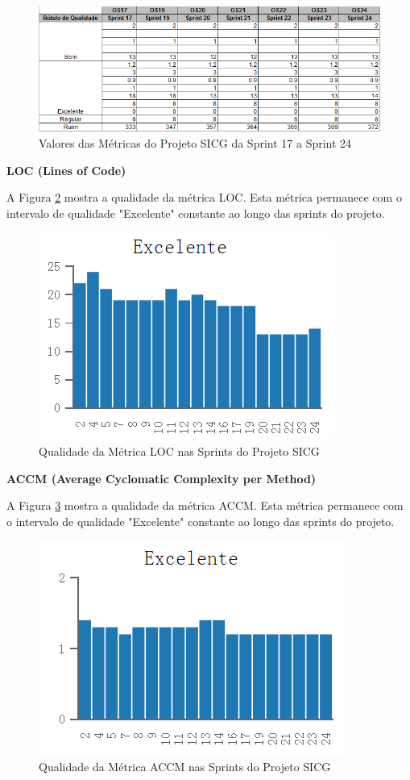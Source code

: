 \begin{figure}[H]
		\centering
			\includegraphics[scale=0.9]{figuras/metricas1724.png}
		\caption{Valores das Métricas do Projeto SICG da Sprint 17 a Sprint 24}
		\label{metricasprint3}
\end{figure}


\textbf{LOC (Lines of Code)}

A Figura \ref{loc} mostra a qualidade da métrica LOC. Esta métrica permanece com o intervalo de qualidade "Excelente" constante ao longo das sprints do projeto.

\begin{figure}[H]
		\centering
			\includegraphics[scale=1.0]{figuras/loc.png}
		\caption{Qualidade da Métrica LOC nas Sprints do Projeto SICG}
		\label{loc}
\end{figure}

\textbf{ACCM (Average Cyclomatic Complexity per Method)}

A Figura \ref{accm} mostra a qualidade da métrica ACCM. Esta métrica permanece com o intervalo de qualidade "Excelente" constante ao longo das sprints do projeto.

\begin{figure}[H]
		\centering
			\includegraphics[scale=1.0]{figuras/accm.png}
		\caption{Qualidade da Métrica ACCM nas Sprints do Projeto SICG}
		\label{accm}
\end{figure}

